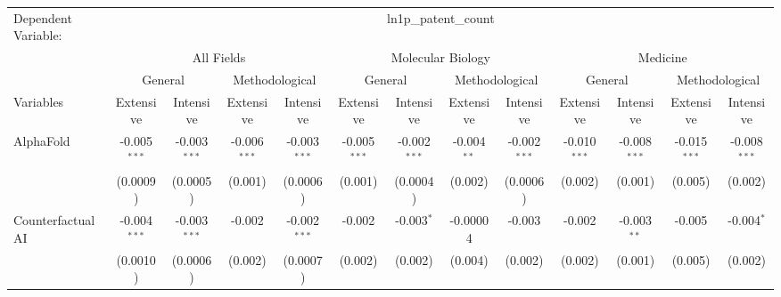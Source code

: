 \begingroup
\centering
\begin{tabular}{lcccccccccccc}
   \tabularnewline \midrule \midrule
   Dependent Variable: & \multicolumn{12}{c}{ln1p\_patent\_count}\\
 & \multicolumn{4}{c}{All Fields} & \multicolumn{4}{c}{Molecular Biology} & \multicolumn{4}{c}{Medicine} \\
\cmidrule(lr){2-5} \cmidrule(lr){6-9} \cmidrule(lr){10-13}
 & \multicolumn{2}{c}{General} & \multicolumn{2}{c}{Methodological} & \multicolumn{2}{c}{General} & \multicolumn{2}{c}{Methodological} & \multicolumn{2}{c}{General} & \multicolumn{2}{c}{Methodological} \\
\cmidrule(lr){2-3} \cmidrule(lr){4-5} \cmidrule(lr){6-7} \cmidrule(lr){8-9} \cmidrule(lr){10-11} \cmidrule(lr){12-13}
Variables & \multicolumn{1}{c}{Extensive} & \multicolumn{1}{c}{Intensive} & \multicolumn{1}{c}{Extensive} & \multicolumn{1}{c}{Intensive} & \multicolumn{1}{c}{Extensive} & \multicolumn{1}{c}{Intensive} & \multicolumn{1}{c}{Extensive} & \multicolumn{1}{c}{Intensive} & \multicolumn{1}{c}{Extensive} & \multicolumn{1}{c}{Intensive} & \multicolumn{1}{c}{Extensive} & \multicolumn{1}{c}{Intensive} \\
\cmidrule(lr){1-1}\cmidrule(lr){2-2} \cmidrule(lr){3-3} \cmidrule(lr){4-4} \cmidrule(lr){5-5} \cmidrule(lr){6-6} \cmidrule(lr){7-7} \cmidrule(lr){8-8} \cmidrule(lr){9-9} \cmidrule(lr){10-10} \cmidrule(lr){11-11} \cmidrule(lr){12-12} \cmidrule(lr){13-13}
   AlphaFold                                & -0.005$^{***}$ & -0.003$^{***}$ & -0.006$^{***}$ & -0.003$^{***}$ & -0.005$^{***}$ & -0.002$^{***}$  & -0.004$^{**}$ & -0.002$^{***}$ & -0.010$^{***}$ & -0.008$^{***}$ & -0.015$^{***}$ & -0.008$^{***}$\\   
                                            & (0.0009)       & (0.0005)       & (0.001)        & (0.0006)       & (0.001)        & (0.0004)        & (0.002)       & (0.0006)       & (0.002)        & (0.001)        & (0.005)        & (0.002)\\   
   Counterfactual AI                        & -0.004$^{***}$ & -0.003$^{***}$ & -0.002         & -0.002$^{***}$ & -0.002         & -0.003$^{*}$    & -0.00004      & -0.003         & -0.002         & -0.003$^{**}$  & -0.005         & -0.004$^{*}$\\   
                                            & (0.0010)       & (0.0006)       & (0.002)        & (0.0007)       & (0.002)        & (0.002)         & (0.004)       & (0.002)        & (0.002)        & (0.001)        & (0.005)        & (0.002)\\   

\end{tabular}
